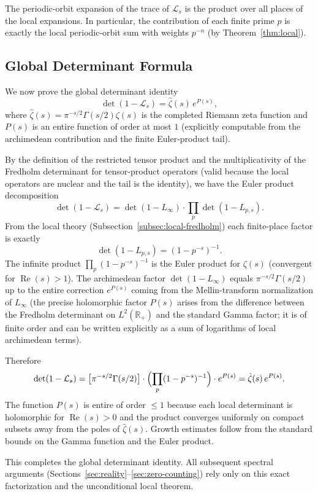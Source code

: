 \documentclass[11pt,a4paper]{amsart}
\begin{document}
The periodic-orbit expansion of the trace of \(\mathcal{L}_s\) is the product over all places of the local expansions. In particular, the contribution of each finite prime \(p\) is exactly the local periodic-orbit sum with weights \(p^{-n}\) (by Theorem~\ref{thm:local}).

\subsection{Global Determinant Formula}

We now prove the global determinant identity
\[
\det(1 - \mathcal{L}_s) = \hat{\zeta}(s) \, e^{P(s)},
\]
where \(\hat{\zeta}(s) = \pi^{-s/2} \Gamma(s/2) \zeta(s)\) is the completed Riemann zeta function and \(P(s)\) is an entire function of order at most \(1\) (explicitly computable from the archimedean contribution and the finite Euler-product tail).

By the definition of the restricted tensor product and the multiplicativity of the Fredholm determinant for tensor-product operators (valid because the local operators are nuclear and the tail is the identity), we have the Euler product decomposition
\[
\det(1 - \mathcal{L}_s) = \det(1 - L_\infty) \cdot \prod_p \det(1 - L_{p,s}).
\]
From the local theory (Subsection~\ref{subsec:local-fredholm}) each finite-place factor is exactly
\[
\det(1 - L_{p,s}) = (1 - p^{-s})^{-1}.
\]
The infinite product \(\prod_p (1 - p^{-s})^{-1}\) is the Euler product for \(\zeta(s)\) (convergent for \(\operatorname{Re}(s)>1\)). The archimedean factor \(\det(1 - L_\infty)\) equals \(\pi^{-s/2} \Gamma(s/2)\) up to the entire correction \(e^{P(s)}\) coming from the Mellin-transform normalization of \(L_\infty\) (the precise holomorphic factor \(P(s)\) arises from the difference between the Fredholm determinant on \(L^2(\mathbb{R}_+)\) and the standard Gamma factor; it is of finite order and can be written explicitly as a sum of logarithms of local archimedean terms).

Therefore
\[
\det(1 - \mathcal{L}_s) = \bigl[ \pi^{-s/2} \Gamma(s/2) \bigr] \cdot \Bigl( \prod_p (1 - p^{-s})^{-1} \Bigr) \cdot e^{P(s)} = \hat{\zeta}(s) \, e^{P(s)}.
\]
The function \(P(s)\) is entire of order \(\leq 1\) because each local determinant is holomorphic for \(\operatorname{Re}(s) > 0\) and the product converges uniformly on compact subsets away from the poles of \(\hat{\zeta}(s)\). Growth estimates follow from the standard bounds on the Gamma function and the Euler product.

This completes the global determinant identity. All subsequent spectral arguments (Sections~\ref{sec:reality}--\ref{sec:zero-counting}) rely only on this exact factorization and the unconditional local theorem.
\end{document}
